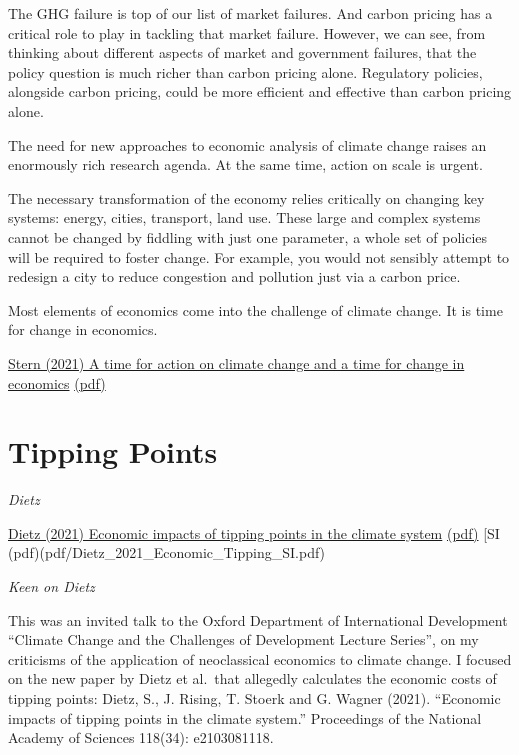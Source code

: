 \documentclass[
]{book}
\begin{document}
The GHG failure is top of our list of market failures. And carbon pricing has a critical role to play in
tackling that market failure. However, we can see, from thinking about different aspects of market and
government failures, that the policy question is much richer than carbon pricing alone.
Regulatory
policies, alongside carbon pricing, could be more efficient and effective than carbon pricing alone.

The need for new approaches to economic analysis of climate change raises an enormously rich
research agenda. At the same time, action on scale is urgent.

The necessary transformation of the economy relies critically on changing key systems: energy, cities,
transport, land use. These large and complex systems cannot be changed by fiddling with just one
parameter, a whole set of policies will be required to foster change. For example, you would not sensibly
attempt to redesign a city to reduce congestion and pollution just via a carbon price.

Most elements of economics come into the challenge of climate change.
It is time for change in economics.

\href{https://www.lse.ac.uk/granthaminstitute/publication/a-time-for-action-on-climate-change-and-a-time-for-change-in-economics/}{Stern (2021) A time for action on climate change and a time for change in economics}
\href{pdf/Stern_2021_Time_for_Change_in_Economics.pdf}{(pdf)}

\hypertarget{tipping-points}{%
\section{Tipping Points}\label{tipping-points}}

\emph{Dietz}

\href{https://doi.org/10.1073/pnas.2103081118}{Dietz (2021) Economic impacts of tipping points in the climate system}
\href{pdf/Dietz_2021_Economic_Tipping.pdf}{(pdf)}
{[}SI (pdf)(pdf/Dietz\_2021\_Economic\_Tipping\_SI.pdf)

\emph{Keen on Dietz}

This was an invited talk to the Oxford Department of International Development ``Climate Change and the Challenges of Development Lecture Series'', on my criticisms of the application of neoclassical economics to climate change. I focused on the new paper by Dietz et al.~that allegedly calculates the economic costs of tipping points: Dietz, S., J. Rising, T. Stoerk and G. Wagner (2021). ``Economic impacts of tipping points in the climate system.'' Proceedings of the National Academy of Sciences 118(34): e2103081118.
\end{document}
